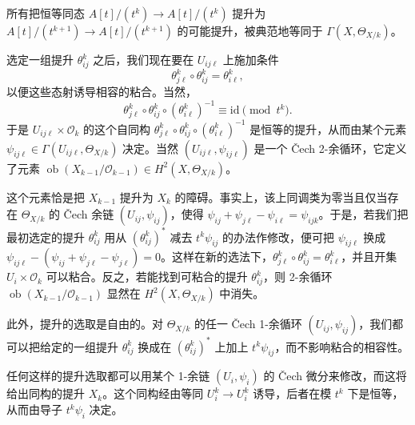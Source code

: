 所有把恒等同态 $A[t]/(t^k)\to A[t]/(t^k)$ 提升为 $A[t]/(t^{k+1})\to A[t]/(t^{k+1})$ 的可能提升，被典范地等同于 $\Gamma(X,\Theta_{X/k})$。

选定一组提升 $\theta_{ij}^{k}$ 之后，我们现在要在 $U_{ij\ell}$ 上施加条件
\[
  \theta_{j\ell}^{k}\circ\theta_{ij}^{k}=\theta_{i\ell}^{k},
\]
以便这些态射诱导相容的粘合。当然，
\[
  \theta_{j\ell}^{k}\circ\theta_{ij}^{k}\circ(\theta_{i\ell}^{k})^{-1}\equiv\mathrm{id}\pmod{t^k}.
\]
于是 $U_{ij\ell}\times\mathcal{O}_k$ 的这个自同构 $\theta_{j\ell}^{k}\circ\theta_{ij}^{k}\circ(\theta_{i\ell}^{k})^{-1}$ 是恒等的提升，从而由某个元素 $\psi_{ij\ell}\in\Gamma(U_{ij\ell},\Theta_{X/k})$ 决定。当然 $(U_{ij\ell},\psi_{ij\ell})$ 是一个 Čech 2-余循环，它定义了元素 $\operatorname{ob}(X_{k-1}/\mathcal{O}_{k-1})\in H^2(X,\Theta_{X/k})$。

这个元素恰是把 $X_{k-1}$ 提升为 $X_k$ 的障碍。事实上，该上同调类为零当且仅当存在 $\Theta_{X/k}$ 的 Čech 余链 $(U_{ij},\psi_{ij})$，使得 $\psi_{ij}+\psi_{j\ell}-\psi_{i\ell}=\psi_{ijk}$。于是，若我们把最初选定的提升 $\theta_{ij}^{k}$ 用从 $(\theta_{ij}^{k})^{*}$ 减去 $t^k\psi_{ij}$ 的办法作修改，便可把 $\psi_{ij\ell}$ 换成 $\psi_{ij\ell}-(\psi_{ij}+\psi_{j\ell}-\psi_{j\ell})=0$。这样在新的选法下，$\theta_{j\ell}^{k}\circ\theta_{ij}^{k}=\theta_{i\ell}^{k}$，并且开集 $U_i\times\mathcal{O}_k$ 可以粘合。反之，若能找到可粘合的提升 $\theta_{ij}^{k}$，则 2-余循环 $\operatorname{ob}(X_{k-1}/\mathcal{O}_{k-1})$ 显然在 $H^2(X,\Theta_{X/k})$ 中消失。


此外，提升的选取是自由的。对 $\Theta_{X/k}$ 的任一 Čech 1-余循环 $(U_{ij},\psi_{ij})$，我们都可以把给定的一组提升 $\theta_{ij}^{k}$ 换成在 $(\theta_{ij}^{k})^{*}$ 上加上 $t^k\psi_{ij}$，而不影响粘合的相容性。

任何这样的提升选取都可以用某个 1-余链 $(U_i,\psi_i)$ 的 Čech 微分来修改，而这将给出同构的提升 $X_k$。这个同构经由等同 $U_i^k\to U_i^k$ 诱导，后者在模 $t^k$ 下是恒等，从而由导子 $t^k\psi_i$ 决定。

